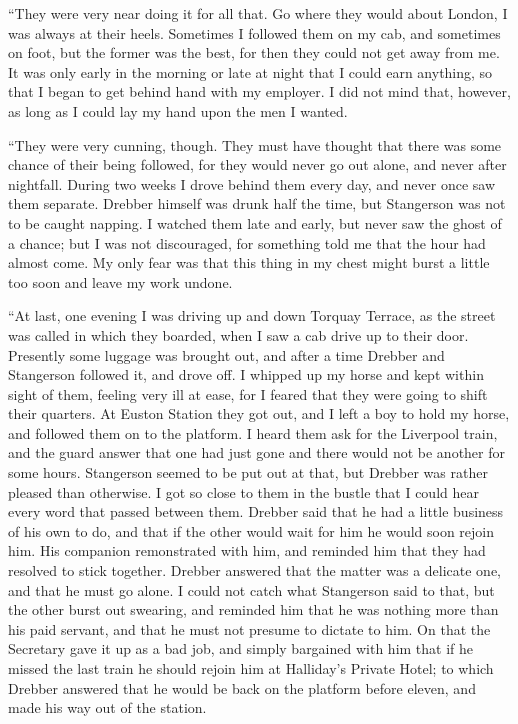 \documentclass[12pt]{book}
\begin{document}
“They were very near doing it for all that. Go where they would about London, I was always at their heels. Sometimes I followed them on my cab, and sometimes on foot, but the former was the best, for then they could not get away from me. It was only early in the morning or late at night that I could earn anything, so that I began to get behind hand with my employer. I did not mind that, however, as long as I could lay my hand upon the men I wanted. 

“They were very cunning, though. They must have thought that there was some chance of their being followed, for they would never go out alone, and never after nightfall. During two weeks I drove behind them every day, and never once saw them separate. Drebber himself was drunk half the time, but Stangerson was not to be caught napping. I watched them late and early, but never saw the ghost of a chance; but I was not discouraged, for something told me that the hour had almost come. My only fear was that this thing in my chest might burst a little too soon and leave my work undone. 

“At last, one evening I was driving up and down Torquay Terrace, as the street was called in which they boarded, when I saw a cab drive up to their door. Presently some luggage was brought out, and after a time Drebber and Stangerson followed it, and drove off. I whipped up my horse and kept within sight of them, feeling very ill at ease, for I feared that they were going to shift their quarters. At Euston Station they got out, and I left a boy to hold my horse, and followed them on to the platform. I heard them ask for the Liverpool train, and the guard answer that one had just gone and there would not be another for some hours. Stangerson seemed to be put out at that, but Drebber was rather pleased than otherwise. I got so close to them in the bustle that I could hear every word that passed between them. Drebber said that he had a little business of his own to do, and that if the other would wait for him he would soon rejoin him. His companion remonstrated with him, and reminded him that they had resolved to stick together. Drebber answered that the matter was a delicate one, and that he must go alone. I could not catch what Stangerson said to that, but the other burst out swearing, and reminded him that he was nothing more than his paid servant, and that he must not presume to dictate to him. On that the Secretary gave it up as a bad job, and simply bargained with him that if he missed the last train he should rejoin him at Halliday’s Private Hotel; to which Drebber answered that he would be back on the platform before eleven, and made his way out of the station. 
\end{document}
